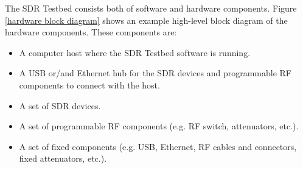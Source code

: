 \documentclass[english,titlepage,a4paper]{report}
\begin{document}
The \gls{SDR Testbed} consists both of software and hardware components.
Figure \ref{hardware block diagram} shows an example high-level block diagram of the hardware components.
These components are:
\begin{itemize}
\item A computer host where the \gls{SDR Testbed} software is running.
\item A \acrshort{USB} or/and \gls{Ethernet} hub for the \acrshort{SDR} devices and programmable \acrshort{RF} components to connect with the host.
\item A set of \acrshort{SDR} devices.
\item A set of programmable \acrshort{RF} components (e.g. \acrshort{RF} switch, attenuators, etc.).
\item A set of fixed components (e.g. \acrshort{USB}, \gls{Ethernet}, \acrshort{RF} cables and connectors, fixed attenuators, etc.).
\end{itemize}
\end{document}
